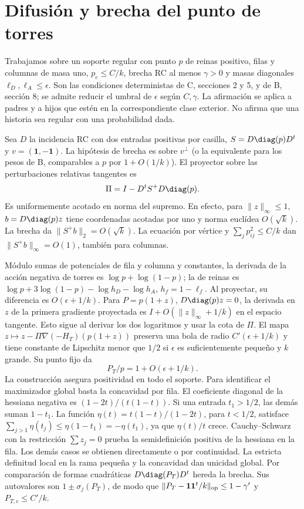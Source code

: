 \section{Difusión y brecha del punto de torres}
Trabajamos sobre un soporte regular con punto $p$ de reinas positivo, filas y columnas
de masa uno, $p_e\le C/k$, brecha RC al menos $\gamma>0$ y masas diagonales
$\ell_D,\ell_A\le\epsilon$. Son las condiciones deterministas de C, secciones 2 y 5,
y de B, sección 8; se admite reducir el umbral de $\epsilon$ según $C,\gamma$.
La afirmación se aplica a padres y a hijos que estén en la correspondiente clase exterior.
No afirma que una historia sea regular con una probabilidad dada.

Sea $D$ la incidencia RC con dos entradas positivas por casilla,
$S=D\diag(p)D^t$ y $v=(\mathbf1,-\mathbf1)$. La hipótesis de brecha es sobre $v^\perp$
(o la equivalente para los pesos de B, comparables a $p$ por $1+O(1/k)$).
El proyector sobre las perturbaciones relativas tangentes es
\[
 \Pi=I-D^tS^+D\diag(p).
\]
Es uniformemente acotado en norma del supremo. En efecto, para $\|z\|_\infty\le1$,
$b=D\diag(p)z$ tiene coordenadas acotadas por uno y norma euclídea $O(\sqrt k)$.
La brecha da $\|S^+b\|_2=O(\sqrt k)$. La ecuación por vértice y
$\sum_jp_{ij}^2\le C/k$ dan $\|S^+b\|_\infty=O(1)$, también para columnas.

Módulo sumas de potenciales de fila y columna y constantes, la derivada de la acción
negativa de torres es $\log p+\log(1-p)$; la de reinas es
$\log p+3\log(1-p)-\log h_D-\log h_A$, $h_f=1-\ell_f$.
Al proyectar, su diferencia es $O(\epsilon+1/k)$. Para $P=p(1+z)$, $D\diag(p)z=0$,
la derivada en $z$ de la primera gradiente proyectada es $I+O(\|z\|_\infty+1/k)$
en el espacio tangente. Esto sigue al derivar los dos logaritmos y usar la cota de $\Pi$.
El mapa $z\mapsto z-\Pi\nabla(-H_T)(p(1+z))$ preserva una bola de radio
$C'(\epsilon+1/k)$ y tiene constante de Lipschitz menor que $1/2$ si $\epsilon$ es
suficientemente pequeño y $k$ grande. Su punto fijo da
\[
 P_T/p=1+O(\epsilon+1/k).
\]
La construcción asegura positividad en todo el soporte. Para identificar el maximizador
global basta la concavidad por fila. El coeficiente diagonal de la hessiana negativa
es $(1-2t)/(t(1-t))$. Si una entrada $t_1>1/2$, las demás suman $1-t_1$.
La función $\eta(t)=t(1-t)/(1-2t)$, para $t<1/2$, satisface
$\sum_{j>1}\eta(t_j)\le\eta(1-t_1)=-\eta(t_1)$, ya que $\eta(t)/t$ crece.
Cauchy--Schwarz con la restricción $\sum z_j=0$ prueba la semidefinición positiva
de la hessiana en la fila. Los demás casos se obtienen directamente o por continuidad.
La estricta definitud local en la rama pequeña y la concavidad dan unicidad global.
Por comparación de formas cuadráticas $D\diag(P_T)D^t$ hereda la brecha.
Sus autovalores son $1\pm\sigma_j(P_T)$, de modo que
$\|P_T-\mathbf1\mathbf1^t/k\|_{\rm op}\le 1-\gamma'$ y $P_{T,e}\le C'/k$.

